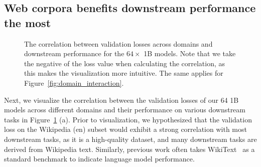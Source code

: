 \subsection{Web corpora benefits downstream performance the most}

\begin{figure}[t]
    \centering
    \hspace{1mm}
    \caption{The correlation between validation losses across domains and downstream performance for the $64 \times$ 1B models. Note that we take the negative of the loss value when calculating the correlation, as this makes the visualization more intuitive. The same applies for Figure~\ref{fig:domain_interaction}. }
    \label{fig:domain-and-task}
\end{figure}

Next, we visualize the correlation between the validation losses of our 64 1B models across different domains and their performance on various downstream tasks in Figure~\ref{fig:domain-and-task} (a). Prior to visualization, we hypothesized that the validation loss on the Wikipedia (en) subset would exhibit a strong correlation with most downstream tasks, as it is a high-quality dataset, and many downstream tasks are derived from Wikipedia text. Similarly, previous work often takes WikiText~\citep{merity2016pointer} as a standard benchmark to indicate language model performance.

